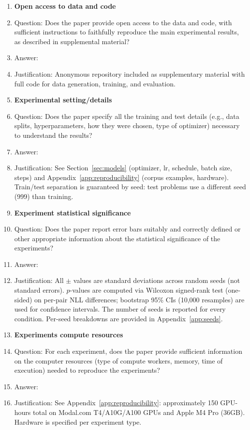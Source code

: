 \documentclass{article}
\begin{document}
\begin{enumerate}
\item {\bf Open access to data and code}
    \item[] Question: Does the paper provide open access to the data and code, with sufficient instructions to faithfully reproduce the main experimental results, as described in supplemental material?
    \item[] Answer: \answerYes{}
    \item[] Justification: Anonymous repository included as supplementary material with full code for data generation, training, and evaluation.

\item {\bf Experimental setting/details}
    \item[] Question: Does the paper specify all the training and test details (e.g., data splits, hyperparameters, how they were chosen, type of optimizer) necessary to understand the results?
    \item[] Answer: \answerYes{}
    \item[] Justification: See Section~\ref{sec:models} (optimizer, lr, schedule, batch size, steps) and Appendix~\ref{app:reproducibility} (corpus examples, hardware). Train/test separation is guaranteed by seed: test problems use a different seed (999) than training.

\item {\bf Experiment statistical significance}
    \item[] Question: Does the paper report error bars suitably and correctly defined or other appropriate information about the statistical significance of the experiments?
    \item[] Answer: \answerYes{}
    \item[] Justification: All $\pm$ values are standard deviations across random seeds (not standard errors). $p$-values are computed via Wilcoxon signed-rank test (one-sided) on per-pair NLL differences; bootstrap 95\% CIs (10{,}000 resamples) are used for confidence intervals. The number of seeds is reported for every condition. Per-seed breakdowns are provided in Appendix~\ref{app:seeds}.

\item {\bf Experiments compute resources}
    \item[] Question: For each experiment, does the paper provide sufficient information on the computer resources (type of compute workers, memory, time of execution) needed to reproduce the experiments?
    \item[] Answer: \answerYes{}
    \item[] Justification: See Appendix~\ref{app:reproducibility}: approximately 150 GPU-hours total on Modal.com T4/A10G/A100 GPUs and Apple M4 Pro (36GB). Hardware is specified per experiment type.


\end{enumerate}
\end{document}
